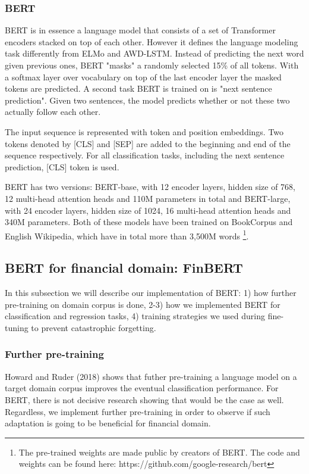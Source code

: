 \documentclass[../main.tex]{subfiles}
\begin{document}
\subsubsection{BERT}
 BERT \cite{Devlin2018} is in essence a language model that consists of a set of Transformer encoders stacked on top of each other. However it defines the language modeling task differently from ELMo and AWD-LSTM. Instead of predicting the next word given previous ones, BERT "masks" a randomly selected 15\% of all tokens. With a softmax layer over vocabulary on top of the last encoder layer the masked tokens are predicted. A second task BERT is trained on is "next sentence prediction". Given two sentences, the model predicts whether or not these two actually follow each other. 
 
 The input sequence is represented with token and position embeddings. Two tokens denoted by \textsc{[CLS]} and \textsc{[SEP]} are added to the beginning and end of the sequence respectively. For all classification tasks, including the next sentence prediction, \textsc{[CLS]} token is used. 
 
 BERT has two versions: BERT-base, with 12 encoder layers, hidden size of 768, 12 multi-head attention heads and 110M parameters in total and BERT-large, with 24 encoder layers, hidden size of 1024, 16 multi-head attention heads and 340M parameters. Both of these models have been trained on BookCorpus \cite{Zhu2015} and English Wikipedia, which have in total more than 3,500M words \footnote{The pre-trained weights are made public by creators of BERT. The code and weights can be found here: https://github.com/google-research/bert}. 
  
\subsection{BERT for financial domain: FinBERT} \label{finbert}
In this subsection we will describe our implementation of BERT: 1) how further pre-training on domain corpus is done, 2-3) how we implemented BERT for classification and regression tasks, 4) training strategies we used during fine-tuning to prevent catastrophic forgetting.
\subsubsection{Further pre-training} \label{further pre-training}
Howard and Ruder (2018) \cite{Howard2018} shows that futher pre-training a language model on a target domain corpus improves the eventual classification performance. For BERT, there is not decisive research showing that would be the case as well. Regardless, we implement further pre-training in order to observe if such adaptation is going to be beneficial for financial domain.
\end{document}
